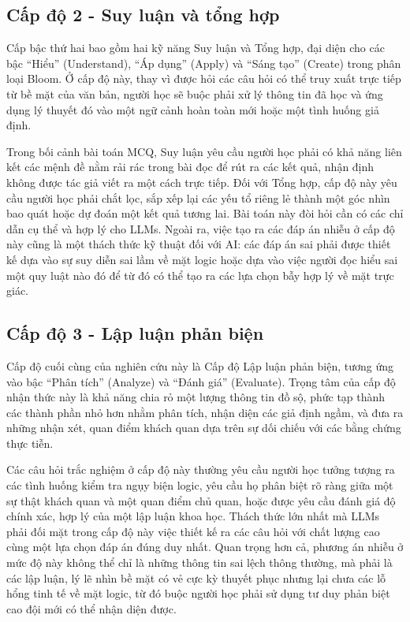 \subsection{Cấp độ 2 - Suy luận và tổng hợp}

Cấp bậc thứ hai bao gồm hai kỹ năng Suy luận và Tổng hợp, đại diện cho các bậc “Hiểu” (Understand), “Áp dụng” (Apply) và “Sáng tạo” (Create) trong phân loại Bloom. Ở cấp độ này, thay vì được hỏi các câu hỏi có thể truy xuất trực tiếp từ bề mặt của văn bản, người học sẽ buộc phải xử lý thông tin đã học và ứng dụng lý thuyết đó vào một ngữ cảnh hoàn toàn mới hoặc một tình huống giả định.

Trong bối cảnh bài toán MCQ, Suy luận yêu cầu người học phải có khả năng liên kết các mệnh đề nằm rải rác trong bài đọc để rút ra các kết quả, nhận định không được tác giả viết ra một cách trực tiếp. Đối với Tổng hợp, cấp độ này yêu cầu người học phải chắt lọc, sắp xếp lại các yếu tổ riêng lẻ thành một góc nhìn bao quát hoặc dự đoán một kết quả tương lai. Bài toán này đòi hỏi cần có các chỉ dẫn cụ thể và hợp lý cho LLMs. Ngoài ra, việc tạo ra các đáp án nhiễu ở cấp độ này cũng là một thách thức kỹ thuật đối với AI: các đáp án sai phải được thiết kế dựa vào sự suy diễn sai lầm về mặt logic hoặc dựa vào việc người đọc hiểu sai một quy luật nào đó để từ đó có thể tạo ra các lựa chọn bẫy hợp lý về mặt trực giác. 

\subsection{Cấp độ 3 - Lập luận phản biện}

Cấp độ cuối cùng của nghiên cứu này là Cấp độ Lập luận phản biện, tương ứng vào bậc “Phân tích” (Analyze) và “Đánh giá” (Evaluate). Trọng tâm của cấp độ nhận thức này là khả năng chia rỏ một lượng thông tin đồ sộ, phức tạp thành các thành phần nhỏ hơn nhằm phân tích, nhận diện các giả định ngầm, và đưa ra những nhận xét, quan điểm khách quan dựa trên sự dối chiếu với các bằng chứng thực tiễn.

Các câu hỏi trắc nghiệm ở cấp độ này thường yêu cầu người học tưởng tượng ra các tình huống kiểm tra ngụy biện logic, yêu cầu họ phân biệt rõ ràng giữa một sự thật khách quan và một quan điểm chủ quan, hoặc được yêu cầu đánh giá độ chính xác, hợp lý của một lập luận khoa học. Thách thức lớn nhất mà LLMs phải đối mặt trong cấp độ này việc thiết kế ra các câu hỏi với chất lượng cao cùng một lựa chọn đáp án đúng duy nhất. Quan trọng hơn cả, phương án nhiễu ở mức độ này không thể chỉ là những thông tin sai lệch thông thường, mà phải là các lập luận, lý lẽ nhìn bề mặt có vẻ cực kỳ thuyết phục nhưng lại chưa các lỗ hổng tinh tế về mặt logic, từ đó buộc người học phải sử dụng tư duy phản biệt cao đội mới có thể nhận diện được.

